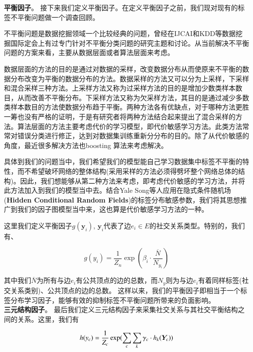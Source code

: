 \textbf{平衡因子}。 接下来我们定义平衡因子。在定义平衡因子之前，我们现对现有的标签不平衡问题做一个调查回顾。

不平衡问题是数据挖掘领域一个比较经典的问题，曾经在IJCAI和KDD等数据挖掘国际定会上有过专门针对不平衡分类问题的研究主题和讨论。从当前解决不平衡问题的方案来看，主要从数据层面或者算法层面来考虑。

数据层面的方法的目的是通过对数据的采样，改变数据分布从而使原来不平衡的数据分布改变为平衡的数据分布的方法。数据采样的方法又可以分为上采样，下采样和混合采样三种方法。上采样方法又称为过采样方法的目的是增加少数类样本数目，从而改善不平衡分布。下采样方法又称为欠采样方法，其目的是通过减少多数类样本数目的方法使数据分布趋于平衡。两种方法各有优缺点，对于哪种方法更胜一筹也没有严格的证明，于是有研究者将两种方法结合起来提出了混合采样的方法。算法层面的方法主要考虑代价的学习模型，即代价敏感学习方法。此类方法常常对错误分类进行修正，达到对数据集训练重新分分布的目的。除了从代价敏感的角度，最近很多解决方法也boosting 算法来考虑解决。

具体到我们的问题当中，我们希望我们的模型能自己学习数据集中标签不平衡的特性，而不希望破坏网络的整体结构(采用采样的方法必须得劈坏整个网络总体的结构)。因此，我们想能够从第二种方法来考虑，即考虑代价敏感的学习方法，并将此方法加入到我们的模型当中去。结合Yale Song等人应用在隐式条件随机场(\textbf{Hidden Conditional Random Fields})的标签分布敏感参数，我们将其思想推广到我们的因子图模型当中来，这也算是代价敏感学习方法的一种。

这里我们定义平衡因子$g(\bm{y}_i)$, $\bm{y}_i$代表了边$e_i \in E$的社交关系类型。特别的，我们有、

\begin{equation}
\label{eq-balance-factor}
g(y_i) = \frac{1}{Z_n} \exp(\beta_i \cdot \frac{\overline{N}}{N_{y_i}})
\end{equation}

其中我们$\overline{N}$为所有与边$e_i$有公共顶点的边的总数，而$N_y$则为与边$e_i$有着同样标签(社交关系类别)、公共顶点的边的总数。
这样以来，我们的平衡因子即相当于一个标签分布学习因子，能够有效的抑制标签不平衡问题所带来的负面影响。\\


\textbf{三元结构因子}。 最后我们定义三元结构因子来采集社交关系与其社交平衡结构之间的关系。这里，我们有

\begin{equation}
\label{eq-triadic-factor}
h(y_c) = \frac{1}{Z_c}\exp(\sum_{c} \sum_{k}\gamma_c \cdot h_k (\bm{Y}_c)) \\
\end{equation}

